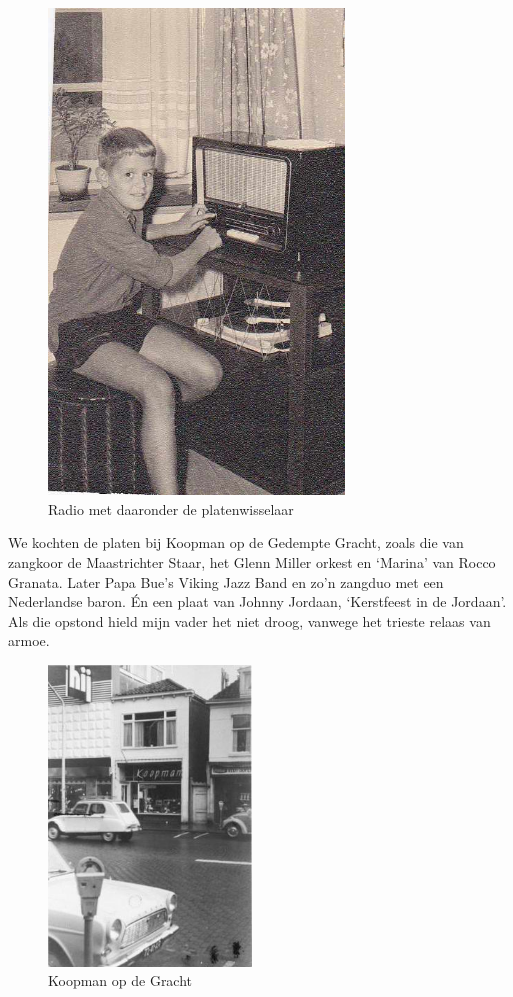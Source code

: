 \documentclass[12pt,twoside, openright]{memoir}
\begin{document}
\begin{figure}
\centering
\includegraphics[width=0.7\textwidth]{img/93jeugdfotoos_0010A}
\caption*{\footnotesize Radio met daaronder de platenwisselaar}
\end{figure}

We kochten de platen bij Koopman op de Gedempte Gracht, zoals die van zangkoor de Maastrichter Staar, het Glenn Miller orkest en `Marina' van Rocco Granata. Later Papa Bue’s Viking Jazz Band en zo’n zangduo met een Nederlandse baron. Én een plaat van Johnny Jordaan, ‘Kerstfeest in de Jordaan’. Als die opstond hield mijn vader het niet droog, vanwege het trieste relaas van armoe. 

\begin{figure}
\begin{center}
\includegraphics[width=0.48\textwidth]{img/128-koopman}
\caption*{\footnotesize Koopman op de Gracht}
\end{center}
\end{figure}
\end{document}

